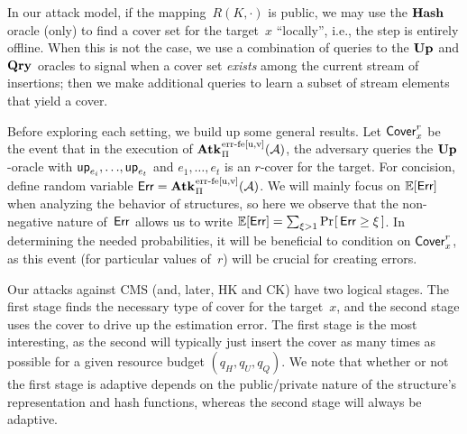 \label{sec:cms-attacks}
\noindent
In our attack model, if the mapping~$R(K,\cdot)$ is public, we may use the $\textup{\textbf{Hash}}\hspace{0.5pt}$ oracle (only) to find a cover set for the target~$x$ ``locally'', i.e., the step is entirely offline.  When this is not the case, we use a combination of queries to the $\textup{\textbf{Up}}\hspace{0.5pt}$ and $\textup{\textbf{Qry}}\hspace{0.5pt}$ oracles to signal when a cover set \emph{exists} among the current stream of insertions; then we make additional queries to learn a subset of stream elements that yield a cover. 

Before exploring each setting, we build up some general results. 
Let $\mathsf{Cover}^{r}_{x}$ be the event that in the execution of $\ExpErrFe{\struct}{\advA}{u,v}$, the adversary queries the $\textup{\textbf{Up}}\hspace{0.5pt}$-oracle with $\mathsf{up}_{e_i},{\dots},\mathsf{up}_{e_t}$ and $e_1,{\dots},e_t$ is an $r$-cover for the target.  For concision, define random variable $\rverr=\ExpErrFe{\struct}{\advA}{u,v}$.  We will mainly focus on $\mathbb{E}[\mathsf{Err}]$ when analyzing the behavior of structures, so here we observe that the non-negative nature of~$\mathsf{Err}$ allows us to write $\mathbb{E}[\mathsf{Err}]=\sum_{\xi > 1} \Pr\hspace{-1pt}\left[\,\mathsf{Err} \geq \xi\,\right]$.  In determining the needed probabilities, it will be beneficial to condition on $\mathsf{Cover}^{r}_{x}$, 
as this event (for particular values of~$r$) will be crucial for creating errors. 


Our attacks against CMS (and, later, HK and CK) have two logical stages.  The first stage finds the necessary type of cover for the target~$x$, and the second stage uses the cover to drive up the estimation error.  The first stage is the most interesting, as the second will typically just insert the cover as many times as possible for a given resource budget $(q_H,q_U,q_Q)$.  We note that whether or not the first stage is adaptive depends on the public/private nature of the structure's representation and hash functions, whereas the second stage will always be adaptive.  

